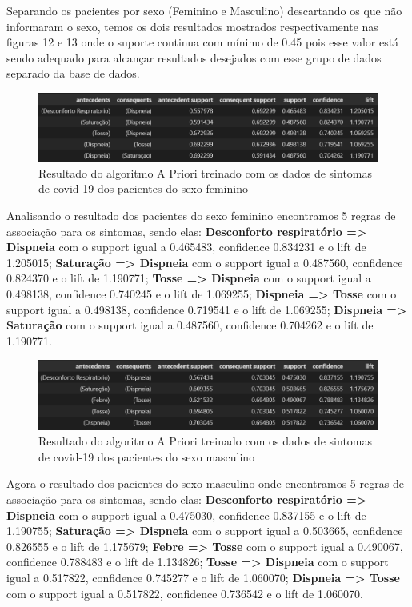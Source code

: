 \documentclass[tcc1]{uftex}
\begin{document}
\begin{itemize}
    
    Separando os pacientes por sexo (Feminino e Masculino) descartando os que não informaram o sexo, temos os dois resultados mostrados respectivamente nas figuras 12 e 13 onde o suporte continua com mínimo de 0.45 pois esse valor está sendo adequado para alcançar resultados desejados com esse grupo de dados separado da base de dados.
    \begin{figure}[!h]
    \centering
    \includegraphics[width=15cm]{resultado_apriori_02(sexoFeminino).png} %
    \caption{Resultado do algoritmo A Priori treinado com os dados de sintomas de covid-19 dos pacientes do sexo feminino}
    \end{figure}
    
    Analisando o resultado dos pacientes do sexo feminino encontramos 5 regras de associação para os sintomas, sendo elas: 
    \textbf{Desconforto respiratório => Dispneia} com o support igual a 0.465483, confidence 0.834231 e o lift de 1.205015;
    \textbf{Saturação => Dispneia} com o support igual a 0.487560, confidence 0.824370 e o lift de 1.190771; 
    \textbf{Tosse => Dispneia} com o support igual a 0.498138, confidence 0.740245 e o lift de 1.069255;
    \textbf{Dispneia => Tosse} com o support igual a 0.498138, confidence 0.719541 e o lift de 1.069255;
    \textbf{Dispneia => Saturação} com o support igual a 0.487560, confidence 0.704262 e o lift de 1.190771.
    
    
    \begin{figure}[!h]
    \centering
    \includegraphics[width=15cm]{resultado_apriori_03(sexoMasculino).png} %
    \caption{Resultado do algoritmo A Priori treinado com os dados de sintomas de covid-19 dos pacientes do sexo masculino}
    \end{figure}
    
    Agora o resultado dos pacientes do sexo masculino onde encontramos 5 regras de associação para os sintomas, sendo elas: 
    \textbf{Desconforto respiratório => Dispneia} com o support igual a 0.475030, confidence 0.837155 e o lift de 1.190755;
    \textbf{Saturação => Dispneia} com o support igual a 0.503665, confidence 0.826555 e o lift de 1.175679; 
    \textbf{Febre => Tosse} com o support igual a 0.490067, confidence 0.788483 e o lift de 1.134826;
    \textbf{Tosse => Dispneia} com o support igual a 0.517822, confidence 0.745277 e o lift de 1.060070;
    \textbf{Dispneia => Tosse} com o support igual a 0.517822, confidence 0.736542 e o lift de 1.060070.
    

\end{itemize}
\end{document}
